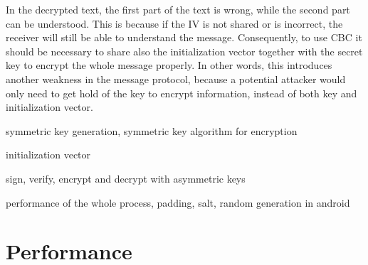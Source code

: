 In the decrypted text, the first part of the text is wrong, while the second part can be understood. This is because if the IV is not shared or is incorrect, the receiver will still be able to understand the message. Consequently, to use CBC it should be necessary to share also the initialization vector together with the secret key to encrypt the whole message properly. In other words, this introduces another weakness in the message protocol, because a potential attacker would only need to get hold of the key to encrypt information, instead of both key and initialization vector.


symmetric key generation, symmetric key algorithm for encryption

initialization vector

sign, verify, encrypt and decrypt with asymmetric keys

performance of the whole process, padding, salt, random generation in android


\section{Performance}


